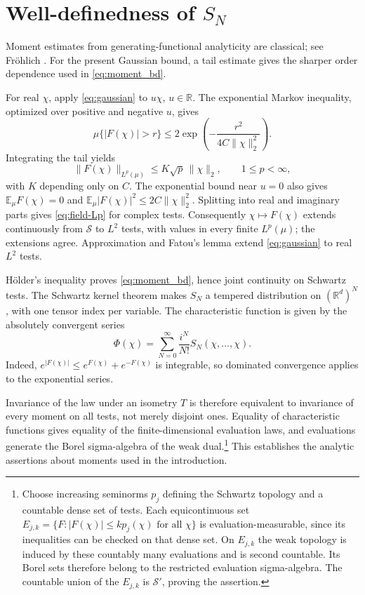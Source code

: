 \documentclass[11pt, letterpaper, reqno]{amsart}
\theoremstyle{definition}
\theoremstyle{remark}
\newcommand{\bbE}{\mathbb{E}}
\newcommand{\bbR}{\mathbb{R}}
\newcommand{\calS}{\mathcal{S}}
\begin{document}
\appendix

\section{Well-definedness of \texorpdfstring{$S_N$}{SN}}\label{sec:well-definedness}

Moment estimates from generating-functional analyticity are classical;
see Fr\"ohlich \cite[Lemma~3.2, pp.~276--277]{Frohlich}. For the present
Gaussian bound, a tail estimate gives the sharper order dependence used
in \eqref{eq:moment_bd}.

For real $\chi$, apply \eqref{eq:gaussian} to $u\chi$, $u\in\bbR$.
The exponential Markov inequality, optimized over positive and
negative $u$, gives
\begin{equation}
 \mu\{|F(\chi)|>r\}\leq2\exp\left(-\frac{r^2}{4C\|\chi\|_2^2}\right).
\end{equation}
Integrating the tail yields
\begin{equation}\label{eq:field-Lp}
 \|F(\chi)\|_{L^p(\mu)}\leq K\sqrt p\,\|\chi\|_2,
 \qquad1\leq p<\infty,
\end{equation}
with $K$ depending only on $C$. The exponential bound near $u=0$
also gives $\bbE_\mu F(\chi)=0$ and
$\bbE_\mu|F(\chi)|^2\leq2C\|\chi\|_2^2$. Splitting into real and
imaginary parts gives \eqref{eq:field-Lp} for complex tests.
Consequently $\chi\mapsto F(\chi)$ extends continuously from
$\calS$ to $L^2$ tests, with values in every finite $L^p(\mu)$;
the extensions agree. Approximation and Fatou's lemma extend
\eqref{eq:gaussian} to real $L^2$ tests.

H\"older's inequality proves \eqref{eq:moment_bd}, hence joint
continuity on Schwartz tests. The Schwartz kernel theorem makes
$S_N$ a tempered distribution on $(\bbR^d)^N$, with one tensor index
per variable. The characteristic function is given by the absolutely
convergent series
\begin{equation}
 \Phi(\chi)=\sum_{N=0}^\infty\frac{i^N}{N!}S_N(\chi,\dots,\chi).
\end{equation}
Indeed, $e^{|F(\chi)|}\leq e^{F(\chi)}+e^{-F(\chi)}$ is integrable,
so dominated convergence applies to the exponential series.

Invariance of the law under an isometry $T$ is therefore equivalent
to invariance of every moment on all tests, not merely disjoint
ones. Equality of characteristic functions gives equality of the
finite-dimensional evaluation laws, and evaluations generate the
Borel sigma-algebra of the weak dual.\footnote{Choose increasing
seminorms $p_j$ defining the Schwartz topology and a countable dense
set of tests. Each equicontinuous set
$E_{j,k}=\{F:|F(\chi)|\leq kp_j(\chi)\text{ for all }\chi\}$ is
evaluation-measurable, since its inequalities can be checked on that
dense set. On $E_{j,k}$ the weak topology is induced by these countably
many evaluations and is second countable. Its Borel sets therefore
belong to the restricted evaluation sigma-algebra. The countable
union of the $E_{j,k}$ is $\calS'$, proving the assertion.}
This establishes the analytic assertions about moments used in
the introduction.
\end{document}
